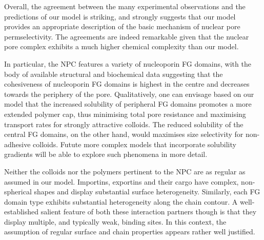 \documentclass[12pt, a4paper]{article}
\begin{document}
Overall, the agreement between the many experimental observations and the predictions of our model is striking, and strongly suggests that our model provides an appropriate description of the basic mechanism of nuclear pore permselectivity.
The agreements are indeed remarkable given that the nuclear pore complex exhibits a much higher chemical complexity than our model.

In particular, the NPC features a variety of nucleoporin FG domains, with the body of available structural and biochemical data suggesting that the cohesiveness of nucleoporin FG domains is highest in the centre and decreases towards the periphery of the pore.
Qualitatively, one can envisage based on our model that the increased solubility of peripheral FG domains promotes a more extended polymer cap, thus minimising total pore resistance and maximising transport rates for strongly attractive colloids.
The reduced solubility of the central FG domains, on the other hand, would maximises size selectivity for non-adhesive colloids.
Futute more complex models that incorporate solubility gradients will be able to explore such phenomena in more detail.

Neither the colloids nor the polymers pertinent to the NPC are as regular as assumed in our model.
Importins, exportins and their cargo have complex, non-spherical shapes and display substantial surface heterogeneity.
Similarly, each FG domain type exhibits substantial heterogeneity along the chain contour.
A well-established salient feature of both these interaction partners though is that they display multiple, and typically weak, binding sites. In this context, the assumption of regular surface and chain properties appears rather well justified.  


\end{document}
